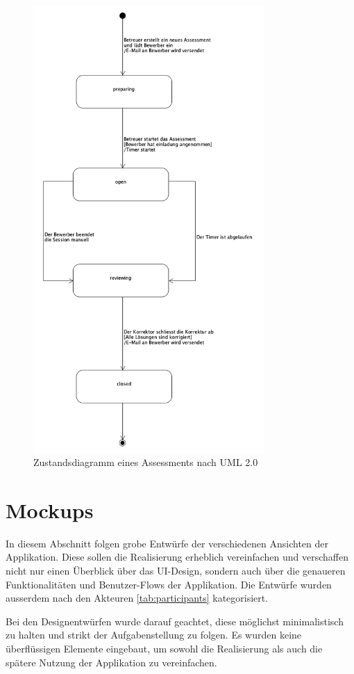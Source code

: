 \begin{figure}[H]
    \centering
    \includegraphics[height=17cm]{images/diagrams/state.png}
    \caption{\label{fig:state-diagram}Zustandsdiagramm eines Assessments nach UML 2.0}
\end{figure}

\newpage

\section{Mockups}

In diesem Abschnitt folgen grobe Entwürfe der verschiedenen Ansichten der Applikation. Diese sollen die Realisierung
erheblich vereinfachen und verschaffen nicht nur einen Überblick über das UI-Design, sondern auch über die genaueren
Funktionalitäten und Benutzer-Flows der Applikation. Die Entwürfe wurden ausserdem nach den Akteuren \ref{tab:participants} kategorisiert.

Bei den Designentwürfen wurde darauf geachtet, diese möglichst minimalistisch zu halten und strikt der Aufgabenstellung zu folgen.
Es wurden keine überflüssigen Elemente eingebaut, um sowohl die Realisierung als auch die spätere Nutzung der Applikation zu vereinfachen.

